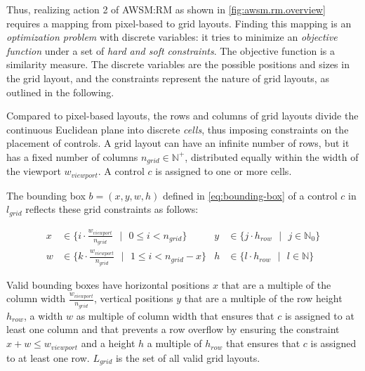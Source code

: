 Thus, realizing action 2 of AWSM:RM as shown in \cref{fig:awsm.rm.overview} requires a mapping from pixel-based to grid layouts.
Finding this mapping is an \emph{optimization problem} with discrete variables: it tries to minimize an \emph{objective function} under a set of \emph{hard and soft constraints}.
The objective function is a similarity measure.
The discrete variables are the possible positions and sizes in the grid layout, and the constraints represent the nature of grid layouts, as outlined in the following.
\vspace{-8pt}

Compared to pixel-based layouts, the rows and columns of grid layouts divide the continuous Euclidean plane into discrete \emph{cells}, thus imposing constraints on the placement of controls.
A grid layout can have an infinite number of rows, but it has a fixed number of columns \(n_{grid} \in \mathbb{N}^+\), distributed equally within the width of the viewport \(w_{viewport}\).
A control \(c\) is assigned to one or more cells.

The bounding box \(b = (x,y,w,h)\) defined in \cref{eq:bounding-box} of a control \(c\) in \(l_{grid}\) reflects these grid constraints as follows:

\begin{equation}
\begin{aligned}
x &\in \bigg\{i \cdot \frac{w_{viewport}}{n_{grid}} \text{ }\bigg |\text{ } 0 \leq i < n_{grid} \bigg\} & y &\in \{j \cdot h_{row} \text{ }|\text{ } j \in \mathbb{N}_0 \} \\
w &\in \bigg\{k \cdot \frac{w_{viewport}}{n_{grid}} \text{ }\bigg |\text{ } 1 \leq i < n_{grid} - x \bigg\} & h &\in \{l \cdot h_{row} \text{ }|\text{ } l \in \mathbb{N} \}
\end{aligned}
\end{equation}

Valid bounding boxes have horizontal positions \(x\) that are a multiple of the column width \(\frac{w_{viewport}}{n_{grid}}\), vertical positions \(y\) that are a multiple of the row height \(h_{row}\), a width \(w\) as multiple of column width that ensures that \(c\) is assigned to at least one column and that prevents a row overflow by ensuring the constraint \(x + w \leq w_{viewport}\) and a height \(h\) a multiple of \(h_{row}\) that ensures that \(c\) is assigned to at least one row.
\(L_{grid}\) is the set of all valid grid layouts.

